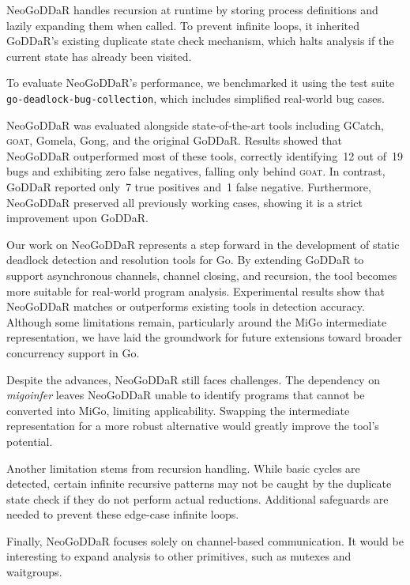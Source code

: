 \documentclass[runningheads]{llncs}
\begin{document}
NeoGoDDaR handles recursion at runtime by storing process definitions and lazily expanding them when called.
To prevent infinite loops, it inherited GoDDaR's existing duplicate state check mechanism, which halts analysis if the current state has already been visited.

To evaluate NeoGoDDaR's performance, we benchmarked it using the test suite \verb|go-deadlock-bug-collection|, which includes simplified real-world bug cases.

NeoGoDDaR was evaluated alongside state-of-the-art tools including GCatch, \textsc{goat}, Gomela, Gong, and the original GoDDaR.
Results showed that NeoGoDDaR outperformed most of these tools, correctly identifying~12 out of~19 bugs and exhibiting zero false negatives, falling only behind \textsc{goat}.
In contrast, GoDDaR reported only~7 true positives and~1 false negative.
Furthermore, NeoGoDDaR preserved all previously working cases, showing it is a strict improvement upon GoDDaR.

Our work on NeoGoDDaR represents a step forward in the development of static deadlock detection and resolution tools for Go.
By extending GoDDaR to support asynchronous channels, channel closing, and recursion, the tool becomes more suitable for real-world program analysis.
Experimental results show that NeoGoDDaR matches or outperforms existing tools in detection accuracy.
Although some limitations remain, particularly around the MiGo intermediate representation, we have laid the groundwork for future extensions toward broader concurrency support in Go.

Despite the advances, NeoGoDDaR still faces challenges.
The dependency on \textit{migoinfer} leaves NeoGoDDaR unable to identify programs that cannot be converted into MiGo, limiting applicability.
Swapping the intermediate representation for a more robust alternative would greatly improve the tool's potential.

Another limitation stems from recursion handling.
While basic cycles are detected, certain infinite recursive patterns may not be caught by the duplicate state check if they do not perform actual reductions.
Additional safeguards are needed to prevent these edge-case infinite loops.

Finally, NeoGoDDaR focuses solely on channel-based communication.
It would be interesting to expand analysis to other primitives, such as mutexes and waitgroups.
\fi



\end{document}
